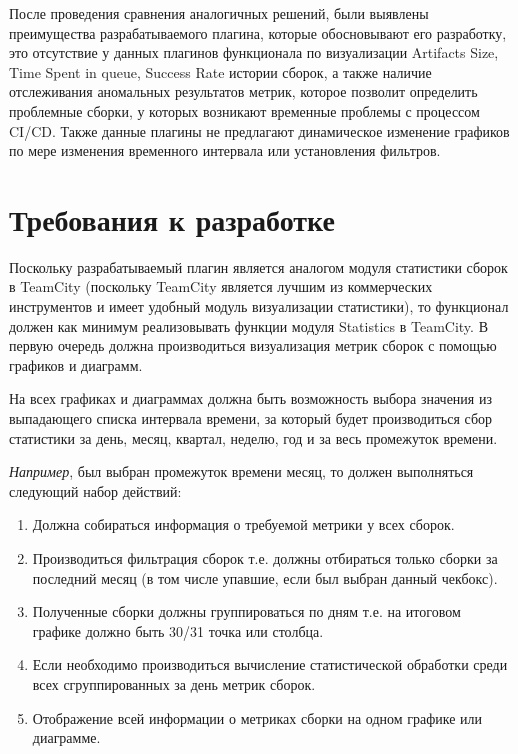   После проведения сравнения аналогичных решений, были выявлены преимущества разрабатываемого плагина, которые обосновывают его разработку, это отсутствие у данных плагинов функционала по визуализации Artifacts Size, Time Spent in queue, Success Rate истории сборок, а также наличие отслеживания аномальных результатов метрик, которое позволит определить проблемные сборки, у которых возникают временные проблемы с процессом CI/CD. Также данные плагины не предлагают динамическое изменение графиков по мере изменения временного интервала или установления фильтров.



\section{Требования к разработке} \label{ch1:sec6}

Поскольку разрабатываемый плагин является аналогом модуля статистики сборок в TeamCity (поскольку TeamCity является лучшим из коммерческих инструментов и имеет удобный модуль визуализации статистики), то функционал должен как минимум реализовывать функции модуля Statistics в TeamCity. В первую очередь должна производиться визуализация метрик сборок с помощью графиков и диаграмм.

На всех графиках и диаграммах должна быть возможность выбора значения из выпадающего списка интервала времени, за который будет производиться сбор статистики за день, месяц, квартал, неделю, год и за весь промежуток времени.

\textit{Например}, был выбран промежуток времени месяц, то должен выполняться следующий набор действий:

\begin{enumerate}
	\item Должна собираться информация о требуемой метрики у всех сборок.
	
	\item Производиться фильтрация сборок т.е. должны отбираться только сборки за последний месяц (в том числе упавшие, если был выбран данный чекбокс).
	
	\item Полученные сборки должны группироваться по дням т.е. на итоговом графике должно быть 30/31 точка или столбца.
	
	\item Если необходимо производиться вычисление статистической обработки среди всех сгруппированных за день метрик сборок.
	
	\item Отображение всей информации о метриках сборки на одном графике или диаграмме.
	
	
\end{enumerate}

